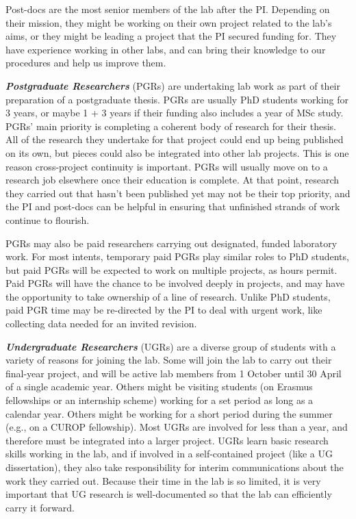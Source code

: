 \documentclass[12pt,]{book}
\theoremstyle{definition}
\theoremstyle{definition}
\theoremstyle{definition}
\theoremstyle{remark}
\begin{document}
Post-docs are the most senior members of the lab after the PI. Depending
on their mission, they might be working on their own project related to
the lab's aims, or they might be leading a project that the PI secured
funding for. They have experience working in other labs, and can bring
their knowledge to our procedures and help us improve them.

\textbf{\emph{Postgraduate Researchers}} (PGRs) are undertaking lab work
as part of their preparation of a postgraduate thesis. PGRs are usually
PhD students working for 3 years, or maybe 1 + 3 years if their funding
also includes a year of MSc study. PGRs' main priority is completing a
coherent body of research for their thesis. All of the research they
undertake for that project could end up being published on its own, but
pieces could also be integrated into other lab projects. This is one
reason cross-project continuity is important. PGRs will usually move on
to a research job elsewhere once their education is complete. At that
point, research they carried out that hasn't been published yet may not
be their top priority, and the PI and post-docs can be helpful in
ensuring that unfinished strands of work continue to flourish.

PGRs may also be paid researchers carrying out designated, funded
laboratory work. For most intents, temporary paid PGRs play similar
roles to PhD students, but paid PGRs will be expected to work on
multiple projects, as hours permit. Paid PGRs will have the chance to be
involved deeply in projects, and may have the opportunity to take
ownership of a line of research. Unlike PhD students, paid PGR time may
be re-directed by the PI to deal with urgent work, like collecting data
needed for an invited revision.

\textbf{\emph{Undergraduate Researchers}} (UGRs) are a diverse group of
students with a variety of reasons for joining the lab. Some will join
the lab to carry out their final-year project, and will be active lab
members from 1 October until 30 April of a single academic year. Others
might be visiting students (on Erasmus fellowships or an internship
scheme) working for a set period as long as a calendar year. Others
might be working for a short period during the summer (e.g., on a CUROP
fellowship). Most UGRs are involved for less than a year, and therefore
must be integrated into a larger project. UGRs learn basic research
skills working in the lab, and if involved in a self-contained project
(like a UG dissertation), they also take responsibility for interim
communications about the work they carried out. Because their time in
the lab is so limited, it is very important that UG research is
well-documented so that the lab can efficiently carry it forward.
\end{document}

